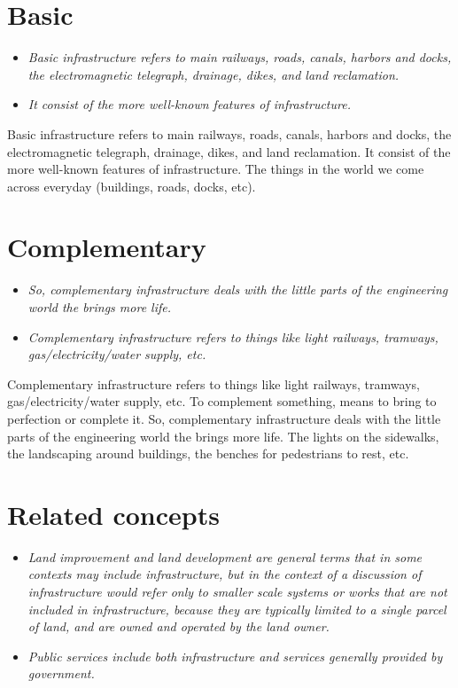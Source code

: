 \section{Basic}\label{basic}

\begin{itemize}
\item
  \emph{Basic infrastructure refers to main railways, roads, canals,
  harbors and docks, the electromagnetic telegraph, drainage, dikes, and
  land reclamation.}
\item
  \emph{It consist of the more well-known features of infrastructure.}
\end{itemize}

Basic infrastructure refers to main railways, roads, canals, harbors and
docks, the electromagnetic telegraph, drainage, dikes, and land
reclamation. It consist of the more well-known features of
infrastructure. The things in the world we come across everyday
(buildings, roads, docks, etc).

\section{Complementary}\label{complementary}

\begin{itemize}
\item
  \emph{So, complementary infrastructure deals with the little parts of
  the engineering world the brings more life.}
\item
  \emph{Complementary infrastructure refers to things like light
  railways, tramways, gas/electricity/water supply, etc.}
\end{itemize}

Complementary infrastructure refers to things like light railways,
tramways, gas/electricity/water supply, etc. To complement something,
means to bring to perfection or complete it. So, complementary
infrastructure deals with the little parts of the engineering world the
brings more life. The lights on the sidewalks, the landscaping around
buildings, the benches for pedestrians to rest, etc.

\section{Related concepts}\label{related-concepts}

\begin{itemize}
\item
  \emph{Land improvement and land development are general terms that in
  some contexts may include infrastructure, but in the context of a
  discussion of infrastructure would refer only to smaller scale systems
  or works that are not included in infrastructure, because they are
  typically limited to a single parcel of land, and are owned and
  operated by the land owner.}
\item
  \emph{Public services include both infrastructure and services
  generally provided by government.}
\end{itemize}

